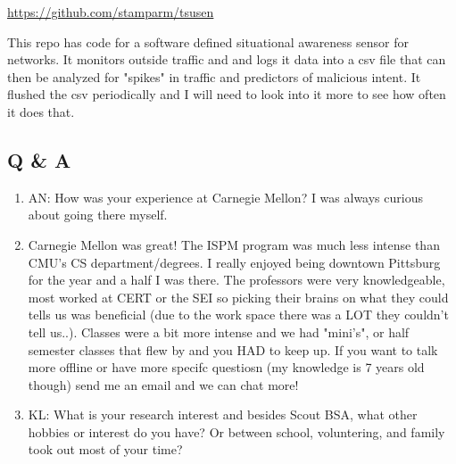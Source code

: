 \url{https://github.com/stamparm/tsusen} 

This repo has code for a software defined situational awareness sensor for networks. It monitors outside traffic and and logs it data into a csv file that can then be analyzed for "spikes" in traffic and predictors of malicious intent. It flushed the csv periodically and I will need to look into it more to see how often it does that.

\subsection{Q \& A}
    \begin{enumerate}
        \item AN: How was your experience at Carnegie Mellon? I was always curious about going there myself.

        \item Carnegie Mellon was great! The ISPM program was much less intense than CMU's CS department/degrees. I really enjoyed being downtown Pittsburg for the year and a half I was there. The professors were very knowledgeable, most worked at CERT or the SEI so picking their brains on what they could tells us was beneficial (due to the work space there was a LOT they couldn't tell us..). Classes were a bit more intense and we had "mini's", or half semester classes that flew by and you HAD to keep up. If you want to talk more offline or have more specifc questiosn (my knowledge is 7 years old though) send me an email and we can chat more!
        
        \item KL: What is your research interest and besides Scout BSA, what other hobbies or interest do you have? Or between school, voluntering, and family took out most of your time?
    
    \end{enumerate}
